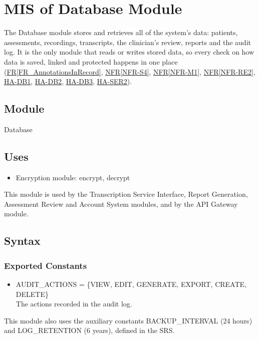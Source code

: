 \documentclass[12pt, titlepage]{article}
\newcommand{\srsref}[2]{\href{https://github.com/Nour-Fawaz/MacaBoca/blob/main/pdfs/SRS/SRS.pdf}{#1\ref*{#2}}}
\newcommand{\hazref}[1]{\href{https://github.com/Nour-Fawaz/MacaBoca/blob/main/pdfs/HazardAnalysis/HazardAnalysis.pdf}{#1}}
\begin{document}
\newpage
\section{MIS of Database Module} \label{Database}
The Database module stores and retrieves all of the system's data: patients, assessments, recordings, transcripts, the clinician's review, reports and the audit log. It is the only module that reads or writes stored data, so every check on how data is saved, linked and protected happens in one place (\srsref{FR}{FR_AnnotationsInRecord}, \srsref{NFR}{NFR-S4}, \srsref{NFR}{NFR-M1}, \srsref{NFR}{NFR-RE2}, \hazref{HA-DB1}, \hazref{HA-DB2}, \hazref{HA-DB3}, \hazref{HA-SER2}).

\subsection{Module}
Database

\subsection{Uses}
\begin{itemize}
\item Encryption module: encrypt, decrypt
\end{itemize}
This module is used by the Transcription Service Interface, Report Generation, Assessment Review and Account System modules, and by the API Gateway module.

\subsection{Syntax}

\subsubsection{Exported Constants}
\begin{itemize}
\item AUDIT\_ACTIONS = \{VIEW, EDIT, GENERATE, EXPORT, CREATE, DELETE\}\\
The actions recorded in the audit log.
\end{itemize}
This module also uses the auxiliary constants BACKUP\_INTERVAL (24 hours) and LOG\_RETENTION (6 years), defined in the SRS.
\end{document}
